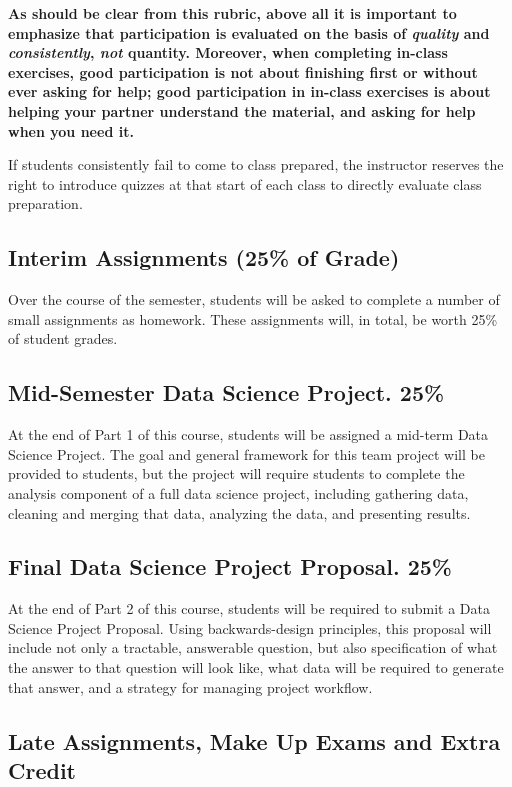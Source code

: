 \documentclass[12pt]{article}
\begin{document}
\textbf{As should be clear from this rubric, above all it is important to emphasize that participation is evaluated on the basis of \emph{quality} and \emph{consistently}, \emph{not} quantity. Moreover, when completing in-class exercises, good participation is not about finishing first or without ever asking for help; good participation in in-class exercises is about helping your partner understand the material, and asking for help when you need it.}

If students consistently fail to come to class prepared, the instructor reserves the right to introduce quizzes at that start of each class to directly evaluate class preparation.

\subsection{Interim Assignments (25\% of Grade)}

Over the course of the semester, students will be asked to complete a number of small assignments as homework. These assignments will, in total, be worth 25\% of student grades.

\subsection{Mid-Semester Data Science Project.  25\%}

At the end of Part 1 of this course, students will be assigned a mid-term Data Science Project. The goal and general framework for this team project will be provided to students, but the project will require students to complete the analysis component of a full data science project, including gathering data, cleaning and merging that data, analyzing the data, and presenting results.

\subsection{Final Data Science Project Proposal. 25\%}

At the end of Part 2 of this course, students will be required to submit a Data Science Project Proposal. Using backwards-design principles, this proposal will include not only a tractable, answerable question, but also specification of what the answer to that question will look like, what data will be required to generate that answer, and a strategy for managing project workflow.

\subsection{Late Assignments, Make Up Exams and Extra Credit}
\end{document}
